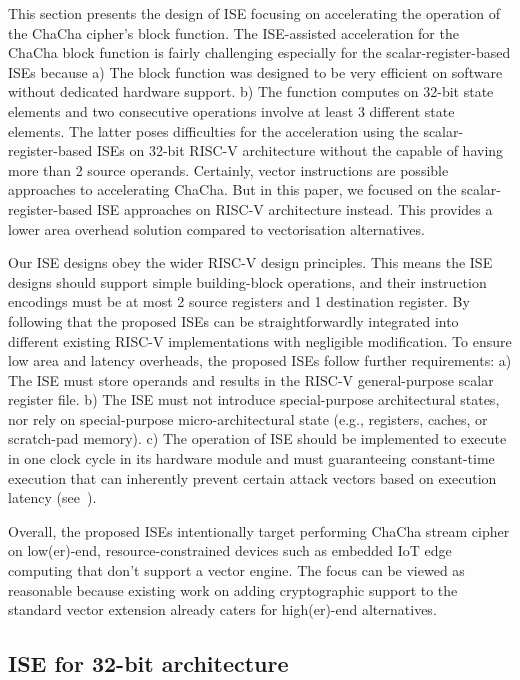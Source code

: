 
This section presents the design of ISE focusing on accelerating the operation of the ChaCha cipher's block function. 
The ISE-assisted acceleration for the ChaCha block function is fairly challenging especially for the scalar-register-based ISEs because 
a) The block function was designed to be very efficient on software without dedicated hardware support. 
b) The function computes on 32-bit state elements and two consecutive operations involve at least 3 different state elements. 
The latter poses difficulties for the acceleration using the scalar-register-based ISEs on 32-bit RISC-V architecture without the capable of having more than 2 source operands.
Certainly, vector instructions are possible approaches to accelerating ChaCha. 
But in this paper, we focused on the scalar-register-based ISE approaches on RISC-V architecture instead. 
This provides a lower area overhead solution compared to vectorisation alternatives. 

Our ISE designs obey the wider RISC-V design principles. 
This means the ISE designs should support simple building-block operations, and their instruction encodings must be at most 2 source registers and 1 destination register. 
By following that the proposed ISEs can be straightforwardly integrated into different existing RISC-V implementations with negligible modification.
To ensure low area and latency overheads, the proposed ISEs follow further requirements: 
a) The ISE must store operands and results in the RISC-V general-purpose scalar register file. 
b) The ISE must not introduce special-purpose architectural states, nor rely on special-purpose micro-architectural state (e.g., registers, caches, or scratch-pad memory).
c) The operation of ISE should be implemented to execute in one clock cycle in its hardware module and must guaranteeing constant-time execution that can  inherently prevent certain attack vectors based on execution latency (see~\cite[Section 4]{GYC:18}).

Overall, the proposed ISEs intentionally target performing ChaCha stream cipher on low(er)-end, resource-constrained devices such as embedded IoT edge computing that don't support a vector engine. The focus can be viewed as reasonable because existing work on adding cryptographic support to the standard vector extension \cite{riscv:ext:vector:draft} already caters for high(er)-end alternatives. 

\subsection{ISE for 32-bit architecture}

